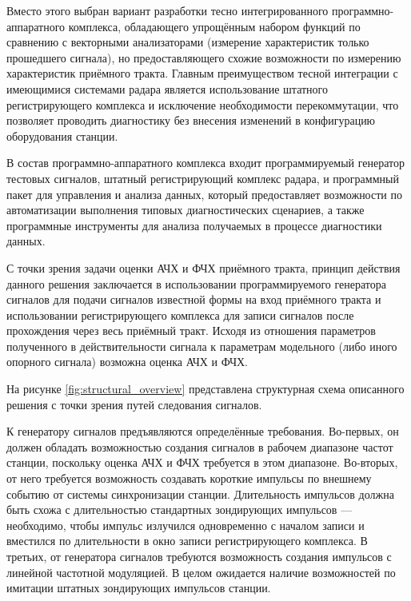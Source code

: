 \documentclass{report}
\begin{document}
Вместо этого выбран вариант разработки тесно интегрированного программно-аппаратного комплекса, обладающего упрощённым набором функций по сравнению с векторными анализаторами (измерение характеристик только прошедшего сигнала), но предоставляющего схожие возможности по измерению характеристик приёмного тракта. Главным преимуществом тесной интеграции с имеющимися системами радара является использование штатного регистрирующего комплекса и исключение необходимости перекоммутации, что позволяет проводить диагностику без внесения изменений в конфигурацию оборудования станции.

В состав программно-аппаратного комплекса входит программируемый генератор тестовых сигналов, штатный регистрирующий комплекс радара, и программный пакет для управления и анализа данных, который предоставляет возможности по автоматизации выполнения типовых диагностических сценариев, а также программные инструменты для анализа получаемых в процессе диагностики данных.

С точки зрения задачи оценки АЧХ и ФЧХ приёмного тракта, принцип действия данного решения заключается в использовании программируемого генератора сигналов для подачи сигналов известной формы на вход приёмного тракта и использовании регистрирующего комплекса для записи сигналов после прохождения через весь приёмный тракт. Исходя из отношения параметров полученного в действительности сигнала к параметрам модельного (либо иного опорного сигнала) возможна оценка АЧХ и ФЧХ.

На рисунке \ref{fig:structural_overview} представлена структурная схема описанного решения с точки зрения путей следования сигналов.


К генератору сигналов предъявляются определённые требования. Во-первых, он должен обладать возможностью создания сигналов в рабочем диапазоне частот станции, поскольку оценка АЧХ и ФЧХ требуется в этом диапазоне. Во-вторых, от него требуется возможность создавать короткие импульсы по внешнему событию от системы синхронизации станции. Длительность импульсов должна быть схожа с длительностью стандартных зондирующих импульсов --- необходимо, чтобы импульс излучился одновременно с началом записи и вместился по длительности в окно записи регистрирующего комплекса. В третьих, от генератора сигналов требуются возможность создания импульсов с линейной частотной модуляцией. В целом ожидается наличие возможностей по имитации штатных зондирующих импульсов станции.
\end{document}
